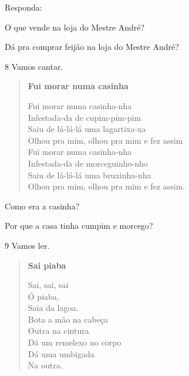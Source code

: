 
Responda:

\begin{escolha}
\item O que vende na loja do Mestre André?


\item Dá pra comprar feijão na loja do Mestre André?

\end{escolha}

\num{8} Vamos cantar.

\begin{verse}
\textbf{Fui morar numa casinha}

Fui morar numa casinha-nha\\
Infestada-da de cupim-pim-pim\\
Saiu de lá-lá-lá uma lagartixa-xa\\
Olhou pra mim, olhou pra mim e fez assim\\
Fui morar numa casinha-nha\\
Infestada-da de morceguinho-nho\\
Saiu de lá-lá-lá uma bruxinha-nha\\
Olhou pra mim, olhou pra mim e fez assim.
\end{verse}


\begin{escolha}
\item Como era a casinha?


\item Por que a casa tinha cumpim e morcego?

\end{escolha}

\num{9} Vamos ler.

\begin{verse}
\textbf{Sai piaba}

Sai, sai, sai\\
Ó piaba,\\
Saia da lagoa.\\
Bota a mão na cabeça\\
Outra na cintura\\
Dá um remelexo no corpo\\
Dá uma umbigada\\
Na outra.
\end{verse}

